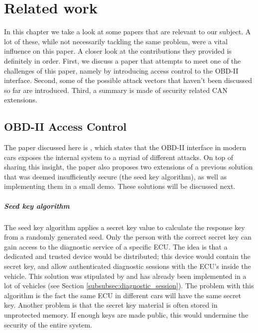 \chapter{Related work}
\label{chap:related_work}

In this chapter we take a look at some papers that are relevant to our subject. A lot of these, while not necessarily tackling the same problem, were a vital influence on this paper. A closer look at the contributions they provided is definitely in order. First, we discuss a paper that attempts to meet one of the challenges of this paper, namely by introducing access control to the OBD-II interface. Second, some of the possible attack vectors that haven't been discussed so far are introduced. Third, a summary is made of security related CAN extensions.

\section{OBD-II Access Control}
\label{sec:obd_access_control}

The paper discussed here is \cite{Yadav16}, which states that the OBD-II interface in modern cars exposes the internal system to a myriad of different attacks. On top of sharing this insight, the paper also proposes two extensions of a previous solution that was deemed insufficiently secure (the seed key algorithm), as well as implementing them in a small demo. These solutions will be discussed next.


\paragraph{Seed key algorithm} The seed key algorithm applies a secret key value to calculate the response key from a randomly generated seed. Only the person with the correct secret key can gain access to the diagnostic service of a specific ECU. The idea is that a dedicated and trusted device would be distributed; this device would contain the secret key, and allow authenticated diagnostic sessions with the ECU's inside the vehicle. This solution was stipulated by \cite{Bayer} and has already been implemented in a lot of vehicles (see Section \ref{subsubsec:diagnostic_session}). The problem with this algorithm is the fact the same ECU in different cars will have the same secret key. Another problem is that the secret key material is often stored in unprotected memory. If enough keys are made public, this would undermine the security of the entire system.  

